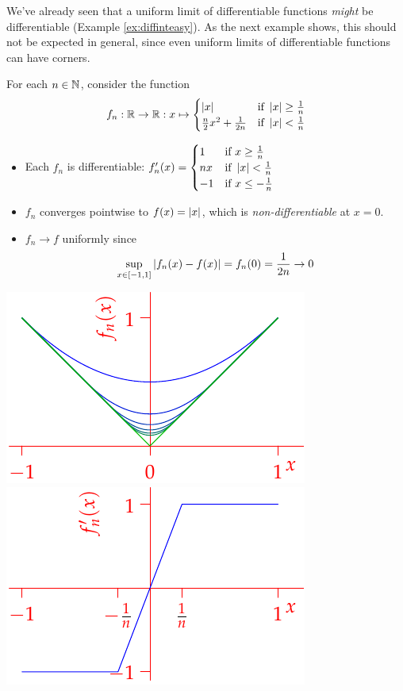 
We've already seen that a uniform limit of differentiable functions \emph{might} be differentiable (Example \ref{ex:diffinteasy}). As the next example shows, this should not be expected in general, since even uniform limits of differentiable functions can have corners.

\begin{example}[lower separated=false, sidebyside, sidebyside align=top seam, sidebyside gap=0pt, righthand width=0.4\linewidth]{}{}
	For each $n\in\mathbb{N}$, consider the function
	\[
		f_n:\mathbb{R}\to\mathbb{R}:x\mapsto 
		\begin{cases}
			\left| x\right|&\text{if }\left| x\right|\ge\frac 1n\\
			\frac n2x^2+\frac 1{2n}&\text{if }\left| x\right|<\frac 1n
		\end{cases}
	\]
	\begin{itemize}
	 	\item Each $f_n$ is differentiable: $f'_n(x)=
	 	\begin{cases}
		  1&\text{if }x\ge\frac 1n\\
		  nx&\text{if }\left| x\right|<\frac 1n\\
		  -1&\text{if }x\le -\frac 1n
	  \end{cases}$
	  \item $f_n$ converges pointwise to \textcolor{Green}{$f(x)=\left| x\right|$}, which is \emph{non-differentiable} at $x=0$.
	  \item $f_n\to f$ uniformly since
	  \[
	  	\sup_{x\in[-1,1]}\left| f_n(x)-f(x)\right| =f_n(0)=\frac 1{2n}\to 0
	  \]
	\end{itemize}
	\tcblower
	\flushright\includegraphics[scale=0.95]{seqex9}\\
	\includegraphics[scale=0.95]{seqex9-1}
\end{example}

